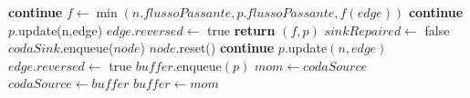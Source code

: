 \documentclass{article}
\begin{document}
\begin{algorithm}
    \begin{algorithmic}
        \STATE\textbf{continue}
        \ELSE
        \STATE $f \leftarrow \min (n.flussoPassante,p.flussoPassante,f(edge))$
        \STATE \textbf{continue}
        \ENDIF
        \STATE $p.$update(n,edge)
        \STATE $edge.reversed \leftarrow$ true
        \STATE \textbf{return } $(f,p)$
        \ENDIF
        \ENDIF
        \STATE $sinkRepaired \leftarrow$ false
        \STATE $codaSink$.enqueue($node$)
        \ENDFOR
        \STATE $node.$reset()
        \ENDFOR
        \STATE\textbf{continue}
        \ENDIF
        \STATE $p$.update$(n,edge)$
        \STATE $edge.reversed \leftarrow$ true
        \STATE $buffer.$enqueue$(p)$
        \ENDIF
        \ENDFOR
        \ENDWHILE
        \STATE $mom \leftarrow codaSource$
        \STATE $codaSource \leftarrow buffer$
        \STATE $buffer \leftarrow mom$
    \end{algorithmic}
\end{algorithm}
\newpage
\end{document}
